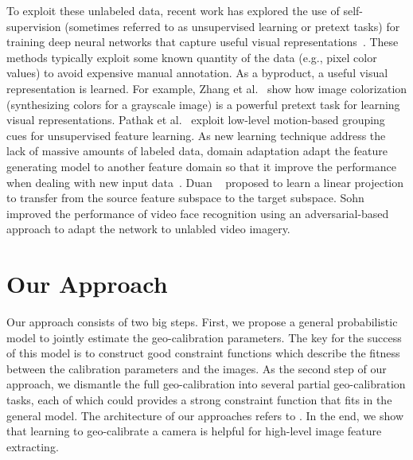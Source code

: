To exploit these unlabeled data, recent work has explored the use of
self-supervision (sometimes referred to as unsupervised learning or
pretext tasks) for training deep neural networks that capture useful
visual representations~\cite{doersch2015unsupervised,pathak2016context}. 
These methods typically
exploit some known quantity of the data (e.g., pixel color values) to
avoid expensive manual annotation. As a byproduct, a useful visual
representation is learned.
For example, Zhang et al.~\cite{zhang2016colorful} show how image
colorization (synthesizing colors for a grayscale image) is a powerful
pretext task for learning visual representations. Pathak et
al.~\cite{pathak2017learning} exploit low-level motion-based grouping
cues for unsupervised feature learning.  
%
As new learning technique address the lack of massive amounts of
labeled data, domain adaptation adapt the feature generating model to
another feature domain so that it improve the performance when dealing
with new input
data~\cite{fernando2013unsupervised,fernando2015joint,saenko2010adapting,wang2016actions,tinghui2016flow}.
Duan \etal~\cite{duan2012learning} proposed to learn a linear
projection to transfer from the source feature subspace to the target
subspace. Sohn \etal~\cite{sohn2017unsupervised} improved the
performance of video face recognition using an adversarial-based
approach to adapt the network to unlabled video imagery.


\section{Our Approach}
Our approach consists of two big steps. First, we propose a general
probabilistic model to jointly estimate the geo-calibration
parameters. The key for the success of this model is to construct good
constraint functions which describe the fitness between the calibration
parameters and the images. As the second step of our approach, we
dismantle the full geo-calibration into several partial
geo-calibration tasks, each of which could provides a strong constraint
function that fits in the general model. The architecture of
our approaches refers to .
%
In the end, we show that learning to geo-calibrate a camera is helpful
for high-level image feature extracting.



